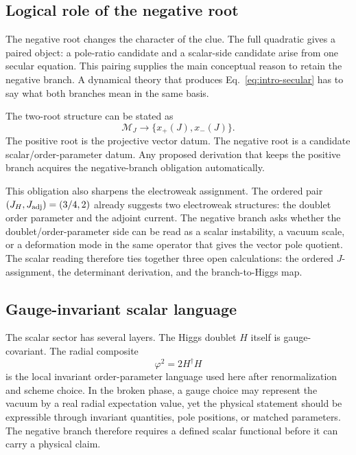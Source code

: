 \subsection{Logical role of the negative root}
\label{sec:negative-logical-role}

The negative root changes the character of the clue.  The full quadratic gives a paired object: a pole-ratio candidate and a scalar-side candidate arise from one secular equation.  This pairing supplies the main conceptual reason to retain the negative branch.  A dynamical theory that produces Eq.~\eqref{eq:intro-secular} has to say what both branches mean in the same basis.

The two-root structure can be stated as
\begin{equation}
  \mathcal M_J\longrightarrow \{x_+(J),x_-(J)\}.
  \label{eq:negative-chain}
\end{equation}
The positive root is the projective vector datum.  The negative root is a
candidate scalar/order-parameter datum.  Any proposed derivation that keeps the
positive branch acquires the negative-branch obligation automatically.

This obligation also sharpens the electroweak assignment.  The ordered pair \((J_H,J_{\rm adj})=(3/4,2)\) already suggests two electroweak structures: the doublet order parameter and the adjoint current.  The negative branch asks whether the doublet/order-parameter side can be read as a scalar instability, a vacuum scale, or a deformation mode in the same operator that gives the vector pole quotient.  The scalar reading therefore ties together three open calculations: the ordered \(J\)-assignment, the determinant derivation, and the branch-to-Higgs map.

\subsection{Gauge-invariant scalar language}
\label{sec:gauge-invariant-scalar-language}

The scalar sector has several layers.  The Higgs doublet \(H\) itself is gauge-covariant.  The radial composite
\begin{equation}
  \varphi^2 = 2H^\dagger H
  \label{eq:radial-composite}
\end{equation}
is the local invariant order-parameter language used here after renormalization and scheme choice.  In the broken phase, a gauge choice may represent the vacuum by a real radial expectation value, yet the physical statement should be expressible through invariant quantities, pole positions, or matched parameters.  The negative branch therefore requires a defined scalar functional before it can carry a physical claim.

